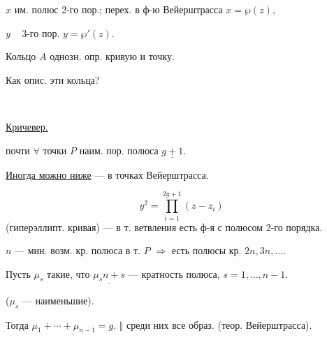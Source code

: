\(x\) им. полюс 2-го пор.; перех. в ф-ю Вейерштрасса \(x=\wp(z)\),

\(y\) \textemdash\,\textquotedbl\,\textemdash\ 3-го пор. \(y=\wp'(z)\).

Кольцо \(A\) однозн. опр. кривую и точку.

Как опис. эти кольца?

\begin{center}\textemdash\,\textperiodcentered\,\textemdash\end{center}

\underline{Кричевер.}

почти \(\forall\) точки \(P\) наим. пор. полюса \(\underline{g+1}\).

\underline{Иногда можно ниже} --- в точках Вейерштрасса.

\[
y^2=\prod_{i=1}^{2g+1}(z-z_i)
\]
(гиперэллипт. кривая) --- в т. ветвления есть ф-я с полюсом 2-го порядка.

\(n\) --- мин. возм. кр. полюса в т. \(P\) \(\Rightarrow\) есть полюсы кр. \(2n,3n,\ldots\).

Пусть \(\mu_s\) такие, что \(\underline{\mu_s n+s}\) ---
кратность полюса, \(s=1,\ldots,n-1\).

(\(\mu_s\) --- наименьшие).

Тогда \(\underline{\mu_1+\cdots+\mu_{n-1}=g}\).
\quad \(\Vert\) среди них все образ. (теор. Вейерштрасса).


